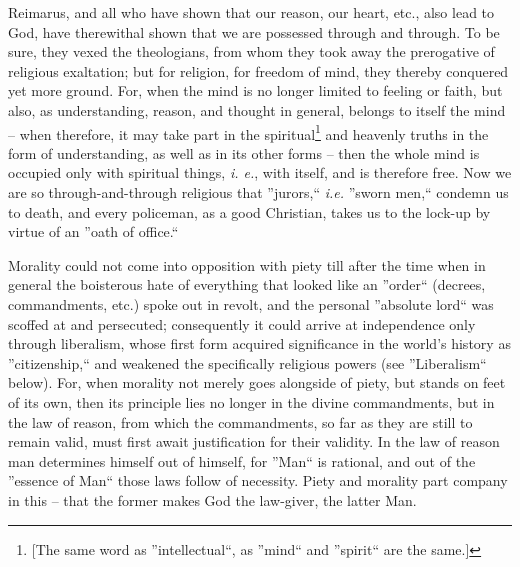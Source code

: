 \documentclass[12pt,a4paper]{book}
\begin{document}
Reimarus, and all who have shown that our reason, our heart, etc., also lead 
to God, have therewithal shown that we are possessed through and through. To 
be sure, they vexed the theologians, from whom they took away the prerogative 
of religious exaltation; but for religion, for freedom of mind, they thereby 
conquered yet more ground. For, when the mind is no longer limited to feeling 
or faith, but also, as understanding, reason, and thought in general, belongs 
to itself the mind -- when therefore, it may take part in the 
spiritual\footnote{[The same word as ''intellectual``, as ''mind`` and 
''spirit`` are the same.]} and heavenly truths in the form of understanding, 
as well as in its other forms -- then the whole mind is occupied only with 
spiritual things, \textit{i. e.}, with itself, and is therefore free. Now we 
are so through-and-through religious that ''jurors,`` \textit{i.e.} ''sworn 
men,`` condemn us to death, and every policeman, as a good Christian, takes 
us to the lock-up by virtue of an ''oath of office.``

Morality could not come into opposition with piety till after the time when in 
general the boisterous hate of everything that looked like an ''order`` 
(decrees, commandments, etc.) spoke out in revolt, and the personal 
''absolute lord`` was scoffed at and persecuted; consequently it could 
arrive at independence only through liberalism, whose first form acquired 
significance in the world's history as ''citizenship,`` and weakened the 
specifically religious powers (see ''Liberalism`` below). For, when morality 
not merely goes alongside of piety, but stands on feet of its own, then its 
principle lies no longer in the divine commandments, but in the law of reason, 
from which the commandments, so far as they are still to remain valid, must 
first await justification for their validity. In the law of reason man 
determines himself out of himself, for ''Man`` is rational, and out of the 
''essence of Man`` those laws follow of necessity. Piety and morality part 
company in this -- that the former makes God the law-giver, the latter Man.
\end{document}
